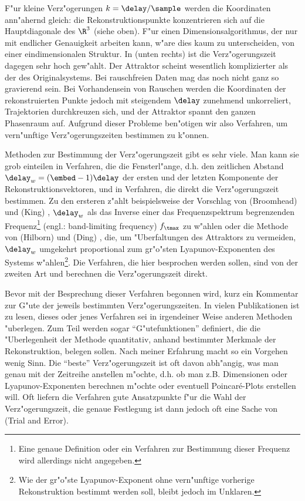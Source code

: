 F"ur kleine Verz"ogerungen $k=\delay/\sample$ werden die Koordinaten ann"ahernd gleich:
 die Rekonstruktionspunkte konzentrieren sich auf
die Hauptdiagonale des $\R^3$ (siehe  oben). F"ur einen
Dimensionsalgorithmus, der nur mit endlicher Genauigkeit arbeiten kann, w"are dies kaum zu
unterscheiden, von einer eindimensionalen Struktur. In  (unten rechts) ist
die Verz"ogerungszeit dagegen sehr hoch gew"ahlt.  Der Attraktor scheint wesentlich
komplizierter als der des Originalsystems. Bei rauschfreien Daten mag das noch nicht ganz
so gravierend sein. Bei Vorhandensein von Rauschen werden die Koordinaten der
rekonstruierten Punkte jedoch mit steigendem $\delay$ zunehmend unkorreliert, Trajektorien
durchkreuzen sich, und der Attraktor spannt den ganzen Phasenraum auf. Aufgrund dieser
Probleme ben"otigen wir also Verfahren, um vern"unftige Verz"ogerungszeiten bestimmen zu
k"onnen.


Methoden zur Bestimmung der Verz"ogerungszeit gibt es sehr viele.  Man kann sie grob
einteilen in Verfahren, die die Fensterl"ange, d.h. den zeitlichen Abstand
$\delay_w=(\embed-1)\delay$ der ersten und der letzten Komponente der
Rekonstruktionsvektoren, und in Verfahren, die direkt die Verz"ogerungszeit bestimmen.  Zu
den ersteren z"ahlt beispielsweise der Vorschlag von \autor(Broomhead) und \autor(King)
\cite{Broomhead-king}, $\delay_w$ als das Inverse einer das Frequenzspektrum begrenzenden
Frequenz\footnote{Eine genaue Definition oder ein Verfahren zur Bestimmung dieser Frequenz
  wird allerdings nicht angegeben.}  (engl.: band-limiting frequency) $f_\tmax$ zu w"ahlen
oder die Methode von \autor(Hilborn) und \autor(Ding) \cite{Hilborn-ding}, die, um
"Uberfaltungen des Attraktors zu vermeiden, $\delay_w$ umgekehrt proportional zum
gr"o"sten Lyapunov-Exponenten des Systems w"ahlen\footnote{Wie der gr"o"ste
  Lyapunov-Exponent ohne vern"unftige vorherige Rekonstruktion bestimmt werden soll,
  bleibt jedoch im Unklaren.}. Die Verfahren, die hier besprochen werden sollen, sind von
der zweiten Art und berechnen die Verz"ogerungszeit direkt.

Bevor mit der Besprechung dieser Verfahren begonnen wird, kurz ein Kommentar zur G"ute der
jeweils bestimmten Verz"ogerungszeiten. In vielen Publikationen ist zu lesen, dieses oder
jenes Verfahren sei in irgendeiner Weise anderen Methoden "uberlegen. Zum Teil werden
sogar ``G"utefunktionen'' definiert, die die "Uberlegenheit der Methode quantitativ,
anhand bestimmter Merkmale der Rekonstruktion, belegen sollen. Nach meiner Erfahrung macht
so ein Vorgehen wenig Sinn. Die ``beste'' Verz"ogerungszeit ist oft davon abh"angig, was
man genau mit der Zeitreihe anstellen m"ochte, d.h. ob man z.B.  Dimensionen oder
Lyapunov-Exponenten berechnen m"ochte oder eventuell Poincar\'e-Plots erstellen will. Oft
liefern die Verfahren gute Ansatzpunkte f"ur die Wahl der Verz"ogerungszeit, die genaue
Festlegung ist dann jedoch oft eine Sache von \naja(Trial and Error).
  

